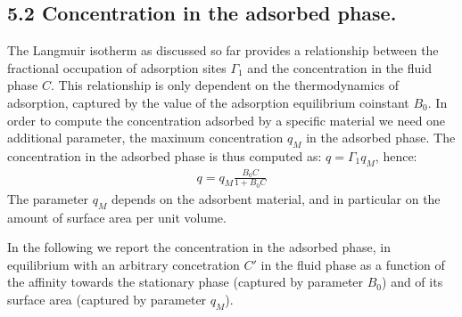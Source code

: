 \documentclass[letterpaper,10pt,english]{jupyterBook}
\begin{document}
\subsection{5.2 Concentration in the adsorbed phase.}
\label{\detokenize{Langmuir_isotherm:concentration-in-the-adsorbed-phase}}
\sphinxAtStartPar
The Langmuir isotherm as discussed so far provides a relationship between the fractional occupation of adsorption sites \(\Gamma_1\) and the concentration in the fluid phase \(C\). This relationship is only dependent on the thermodynamics of adsorption, captured by the value of the adsorption equilibrium coinstant \(B_0\). In order to compute the concentration adsorbed by a specific material we need one additional parameter, the maximum concentration \(q_M\) in the adsorbed phase.
The concentration in the adsorbed phase is thus computed as: \(q=\Gamma_1{q_M}\), hence:
\begin{equation}\label{equation:Langmuir_isotherm:LANGeq7}
\begin{split}
q=q_M\frac{B_0{C}}{1+B_0{C}}
\end{split}
\end{equation}
\sphinxAtStartPar
The parameter \(q_M\) depends on the adsorbent material, and in particular on the amount of surface area per unit volume.

\sphinxAtStartPar
In the following we report the concentration in the adsorbed phase, in equilibrium with an arbitrary concetration \(C'\) in the fluid phase as a function of the affinity towards the stationary phase (captured by parameter \(B_0\)) and of its surface area (captured by parameter \(q_M\)).
\end{document}
